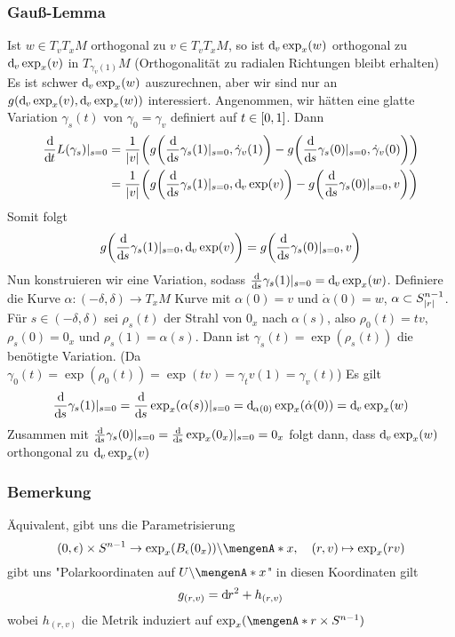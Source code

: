\subsubsection{Gauß-Lemma}
\label{ssub:248}
Ist $w\in T_v T_x M$ orthogonal zu $v\in T_vT_x M$, so ist $\mathrm{d}\mkern-1.0mu_v \exp_x(w)$ orthogonal zu $\mathrm{d}\mkern-1.0mu_v \exp_x (v)$ in $T_{\gamma_v(1)} M$ (Orthogonalität zu radialen Richtungen bleibt erhalten)
Es ist schwer $\mathrm{d}\mkern-1.0mu_v \exp_x(w)$ auszurechnen, aber wir sind nur an $g\enbrace*{\mathd_v \exp_x(v),\mathd_v \exp_x(w)}$ interessiert. Angenommen, wir hätten eine glatte Variation $\gamma_s(t)$ von $\gamma_0 = \gamma_v$ definiert auf $t\in [0,1]$. Dann
\begin{align*}
\frac{\mathd}{\mathd t} L(\gamma_s)\vert_{s=0} & = \frac{1}{\abs{v}} \enbrace*{g\enbrace*{\frac{\mathd}{\mathd s}\gamma_s(1)\vert_{s=0},\dot{\gamma}_v(1)} - g\enbrace*{\frac{\mathd}{\mathd s}\gamma_s(0)\vert_{s=0},\dot{\gamma}_v(0)}}\\
& = \frac{1}{\abs{v}} \enbrace*{g\enbrace*{\frac{\mathd}{\mathd s}\gamma_s(1)\vert_{s=0},\mathd_v \exp(v)} - g\enbrace*{\frac{\mathd}{\mathd s}\gamma_s(0)\vert_{s=0},v}}
\end{align*}
Somit folgt 
\[
g\enbrace*{\frac{\mathd}{\mathd s}\gamma_s(1)\vert_{s=0},\mathd_v \exp(v)} = g\enbrace*{\frac{\mathd}{\mathd s}\gamma_s(0)\vert_{s=0},v}
\]
Nun konstruieren wir eine Variation, sodass $\frac{\mathrm{d}\mkern-1.0mu}{\mathrm{d}\mkern-1.0mu s} \gamma_s(1)\vert_{s=0} = \mathrm{d}\mkern-1.0mu_v \exp_x(w)$. Definiere die Kurve $\alpha:(-\delta,\delta)\to T_x M$ Kurve mit $\alpha(0) = v$ und $\dot{\alpha}(0) = w$, $\alpha \subset S_{\lvert r\rvert}^{n-1}$. Für $s\in (-\delta,\delta)$ sei $\rho_s(t)$ der Strahl von $0_x$ nach $\alpha(s)$, also $\rho_0(t) = tv$, $\rho_s(0) = 0_x$ und $\rho_s(1) = \alpha(s)$. Dann ist $\gamma_s(t) = \exp(\rho_s(t))$ die benötigte Variation. (Da $\gamma_0(t) = \exp(\rho_0(t)) = \exp(tv) = \gamma_tv(1) = \gamma_v(t)$)
Es gilt 
\[
\frac{\mathrm{d}\mkern-1.0mu}{\mathrm{d}\mkern-1.0mu s} \gamma_s(1)\vert_{s=0} = \frac{\mathrm{d}\mkern-1.0mu}{\mathrm{d}\mkern-1.0mu s} \exp_x (\alpha(s))\vert_{s=0} = \mathrm{d}\mkern-1.0mu_{\alpha(0)} \exp_x(\dot{\alpha}(0)) = \mathrm{d}\mkern-1.0mu_v \exp_x(w)
\]
Zusammen mit $\frac{\mathrm{d}\mkern-1.0mu}{\mathrm{d}\mkern-1.0mu s}\gamma_s(0)\vert_{s=0} = \frac{\mathrm{d}\mkern-1.0mu}{\mathrm{d}\mkern-1.0mu s} \exp_x(0_x)\vert_{s=0} = 0_x$ folgt dann, dass $\mathrm{d}\mkern-1.0mu_v \exp_x(w)$ orthongonal zu $\mathrm{d}\mkern-1.0mu_v \exp_x(v)$

\subsubsection{Bemerkung}
\label{ssub:249}
Äquivalent, gibt uns die Parametrisierung
\[
(0,\epsilon)\times S^{n-1} \to \exp_x(B_\epsilon(0_x))\backslash \set{x},\quad (r,v)\mapsto \exp_x(rv) 
\]
gibt uns "Polarkoordinaten auf $U\backslash \set{x}$" in diesen Koordinaten gilt
\[
g_{(r,v)} = \mathrm{d}\mkern-1.0mu r^2 + h_{(r,v)}
\]
wobei $h_{(r,v)}$ die Metrik induziert auf $\exp_x (\set{r}\times S^{n-1})$

